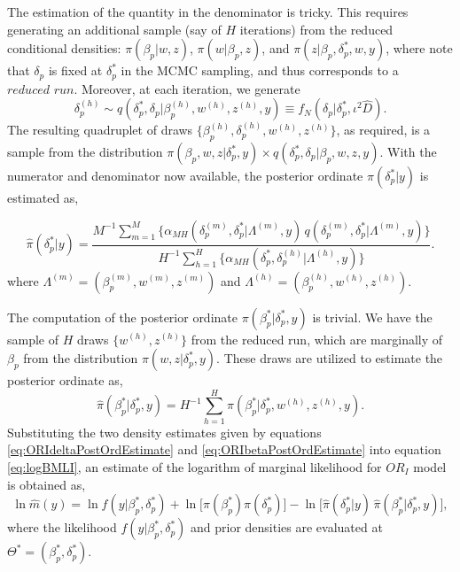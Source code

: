 The estimation of the quantity in the denominator is tricky. This requires generating an additional sample (say of \(H\) iterations) from the reduced conditional densities: \(\pi(\beta_{p}|w,z)\), \(\pi(w|\beta_{p},z)\), and \(\pi(z|\beta_{p},\delta_{p}^{\ast},w,y)\), where note that \(\delta_{p}\) is fixed at \(\delta_{p}^{\ast}\) in the MCMC sampling, and thus corresponds to a \(\textit{reduced run}\). Moreover, at each iteration, we generate
\begin{equation*} 
\delta_{p}^{(h)} \sim q(\delta_{p}^{\ast},\delta_{p}|\beta_{p}^{(h)},w^{(h)},z^{(h)},y) \equiv f_{N}(\delta_{p}|\delta_{p}^{\ast}, \iota^{2} \hat{D}).
\end{equation*}
The resulting quadruplet of draws \(\{\beta_{p}^{(h)}, \delta_{p}^{(h)}, w^{(h)}, z^{(h)} \}\), as required, is a sample from the distribution \(\pi(\beta_{p},w,z|\delta_{p}^{\ast},y) \times q(\delta_{p}^{\ast}, \delta_{p}|\beta_{p},w,z,y)\). With the numerator and denominator now available, the posterior ordinate \(\pi(\delta_{p}^{\ast}|y)\) is estimated as,

\begin{equation}
\hat{\pi}(\delta_{p}^{\ast}|y) = \frac{ M^{-1} \sum_{m=1}^{M} \{ \alpha_{MH} (\delta_{p}^{(m)}, \delta_{p}^{\ast}|\Lambda^{(m)},y) \, q(\delta_{p}^{(m)}, \delta_{p}^{\ast}|\Lambda^{(m)},y) \} } {H^{-1} \sum_{h=1}^{H} \{ \alpha_{MH}(\delta_{p}^{\ast}, \delta_{p}^{(h)}|\Lambda^{(h)},y)\} }.
\label{eq:ORIdeltaPostOrdEstimate} 
\end{equation}
where \(\Lambda^{(m)} = (\beta_{p}^{(m)},w^{(m)},z^{(m)})\) and \(\Lambda^{(h)}=(\beta_{p}^{(h)},w^{(h)},z^{(h)})\).

The computation of the posterior ordinate \(\pi(\beta_{p}^{\ast}| \delta_{p}^{\ast},y)\) is trivial. We have the sample of \(H\) draws \(\{ w^{(h)}, z^{(h)} \}\) from the reduced run, which are marginally of \(\beta_{p}\) from the distribution \(\pi(w,z|\delta_{p}^{\ast},y)\). These draws are utilized to estimate the posterior ordinate as,
\begin{equation} 
\hat{\pi}(\beta_{p}^{\ast}|\delta_{p}^{\ast},y) = H^{-1} \sum_{h=1}^{H} \pi(\beta_{p}^{\ast}|\delta_{p}^{\ast},w^{(h)},z^{(h)},y).
\label{eq:ORIbetaPostOrdEstimate} 
\end{equation}
Substituting the two density estimates given by equations \eqref{eq:ORIdeltaPostOrdEstimate} and \eqref{eq:ORIbetaPostOrdEstimate} into equation \eqref{eq:logBMLI}, an estimate of the logarithm of marginal likelihood for \(OR_{I}\) model is obtained as,
\begin{equation} 
\ln \hat{m}(y) = \ln f(y|\beta_{p}^{\ast},\delta_{p}^{\ast}) + \ln \Big[ \pi(\beta_{p}^{\ast}) \pi(\delta_{p}^{\ast}) \Big] - \ln \Big[ \hat{\pi}(\delta_{p}^{\ast}|y) \, \hat{\pi}(\beta_{p}^{\ast}|\delta_{p}^{\ast},y) \Big], 
\label{eq:ORIMLestimate}
\end{equation}
where the likelihood \(f(y|\beta_{p}^{\ast},\delta_{p}^{\ast})\) and prior densities are evaluated at \(\Theta^{\ast} = (\beta_{p}^{\ast}, \delta_{p}^{\ast})\).

